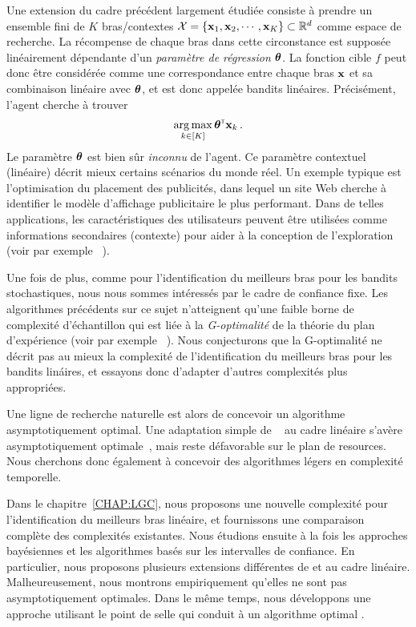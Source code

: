 Une extension du cadre pr\'ec\'edent largement étudiée consiste à prendre un ensemble fini de $K$ bras/contextes $\mathcal{X}=\{{\bf x}_1,{\bf x}_2,\cdots,{\bf x}_K\}\subset\mathbb{R}^d$ comme espace de recherche. La récompense de chaque bras dans cette circonstance est supposée linéairement d\'ependante d'un \emph{paramètre de régression} ${\boldsymbol \theta}$. La fonction cible $f$ peut donc être considérée comme une correspondance entre chaque bras ${\bf x}$ et sa combinaison linéaire avec ${\boldsymbol \theta}$, et est donc appelée bandits linéaires. Précisément, l'agent cherche à trouver
\begin{align}\label{eq:abs.optim_linbai}
    \operatorname*{arg\,max}_{k\in[K]} {\boldsymbol \theta}^{\mathsf{\scriptscriptstyle T}}{\bf x}_k\,.
\end{align}
Le paramètre ${\boldsymbol \theta}$ est bien sûr \emph{inconnu} de l'agent. Ce paramètre contextuel (linéaire) décrit mieux certains scénarios du monde réel. Un exemple typique est l'optimisation du placement des publicités, dans lequel un site Web cherche à identifier le modèle d'affichage publicitaire le plus performant. Dans de telles applications, les caractéristiques des utilisateurs peuvent être utilisées comme informations secondaires (contexte) pour aider à la conception de l'exploration (voir par exemple ~\citealt{li2010contextual}).

Une fois de plus, comme pour l'identification du meilleurs bras pour les bandits stochastiques, nous nous sommes intéressés par le cadre de confiance fixe. Les algorithmes précédents sur ce sujet n'atteignent qu'une faible borne de complexité d'échantillon qui est liée à la \emph{G-optimalité} de la théorie du plan d'expérience (voir par exemple ~\citealt{pukelsheim2006optimal}). Nous conjecturons que la G-optimalité ne décrit pas au mieux la complexité de l'identification du meilleurs bras pour les bandits lin\'aires, et essayons donc d'adapter d'autres complexités plus appropriées.

Une ligne de recherche naturelle est alors de concevoir un algorithme asymptotiquement optimal. Une adaptation simple de \Track~\citep{garivier2016tracknstop} au cadre linéaire s'avère asymptotiquement optimale~\citep{jedra2020linear}, mais reste défavorable sur le plan de resources. Nous cherchons donc également à concevoir des algorithmes l\'egers en complexit\'e temporelle. 

Dans le chapitre~\ref{CHAP:LGC}, nous proposons une nouvelle complexité pour l'identification du meilleurs bras linéaire, et fournissons une comparaison complète des complexités existantes. Nous étudions ensuite \`a la fois les approches bayésiennes et les algorithmes basés sur les intervalles de confiance. En particulier, nous proposons plusieurs extensions différentes de \TTTS{} et \TCC{} au cadre linéaire. Malheureusement, nous montrons empiriquement qu'elles ne sont pas asymptotiquement optimales. Dans le même temps, nous développons une approche utilisant le point de selle qui conduit à un algorithme optimal \LG{}.

